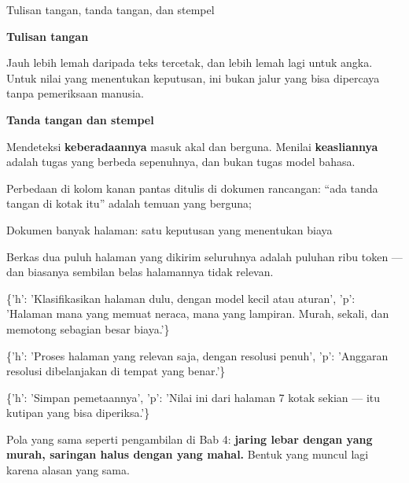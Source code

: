 \documentclass[aspectratio=169,11pt,t]{beamer}
\begin{document}
\begin{frame}[shrink=25]{Tulisan tangan, tanda tangan, dan stempel}
\begin{minipage}[t]{0.485\textwidth}
{\fontsize{9.4}{12.6}\selectfont\color{fg2}\textbf{Tulisan tangan}\par}\vskip 4pt
{\fontsize{9.4}{12.6}\selectfont\color{fg2}Jauh lebih lemah daripada teks tercetak, dan lebih lemah lagi untuk angka. Untuk nilai yang menentukan keputusan, ini bukan jalur yang bisa dipercaya tanpa pemeriksaan manusia.\par}\vskip 4pt

\end{minipage}%
\hfill
\begin{minipage}[t]{0.485\textwidth}
{\fontsize{9.4}{12.6}\selectfont\color{fg2}\textbf{Tanda tangan dan stempel}\par}\vskip 4pt
{\fontsize{9.4}{12.6}\selectfont\color{fg2}Mendeteksi \textbf{keberadaannya} masuk akal dan berguna. Menilai \textbf{keasliannya} adalah tugas yang berbeda sepenuhnya, dan bukan tugas model bahasa.\par}\vskip 4pt

\end{minipage}%
\begin{iband}[signal]
Perbedaan di kolom kanan pantas ditulis di dokumen rancangan: ``ada tanda tangan di kotak itu'' adalah temuan yang berguna; 
\end{iband}
\end{frame}

\begin{frame}[shrink=25]{Dokumen banyak halaman: satu keputusan yang menentukan biaya}
{\fontsize{9.4}{12.6}\selectfont\color{fg2}Berkas dua puluh halaman yang dikirim seluruhnya adalah puluhan ribu token --- dan biasanya sembilan belas halamannya tidak relevan.\par}\vskip 4pt
\begin{isteps}
\item \{'h': 'Klasifikasikan halaman dulu, dengan model kecil atau aturan', 'p': 'Halaman mana yang memuat neraca, mana yang lampiran. Murah, sekali, dan memotong sebagian besar biaya.'\}
\item \{'h': 'Proses halaman yang relevan saja, dengan resolusi penuh', 'p': 'Anggaran resolusi dibelanjakan di tempat yang benar.'\}
\item \{'h': 'Simpan pemetaannya', 'p': 'Nilai ini dari halaman 7 kotak sekian --- itu kutipan yang bisa diperiksa.'\}
\end{isteps}
\begin{iband}[signal]
Pola yang sama seperti pengambilan di Bab 4: \textbf{jaring lebar dengan yang murah, saringan halus dengan yang mahal.} Bentuk yang muncul lagi karena alasan yang sama.
\end{iband}
\end{frame}
\end{document}
